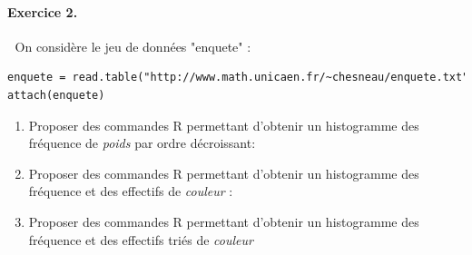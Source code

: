 \paragraph{Exercice 2. }\textcolor{white}{.}\newline
On considère le jeu de données "enquete" :
\begin{lstlisting}[language=html]
enquete = read.table("http://www.math.unicaen.fr/~chesneau/enquete.txt",header = T)
attach(enquete)
\end{lstlisting}
\begin{enumerate}
\item Proposer des commandes R permettant d'obtenir un histogramme des fréquence de \textit{poids} par ordre décroissant: 
\item Proposer des commandes R permettant d'obtenir un histogramme des fréquence et des effectifs de \textit{couleur} : 
\item Proposer des commandes R permettant d'obtenir un histogramme des fréquence et des effectifs triés de \textit{couleur} 
\end{enumerate}

